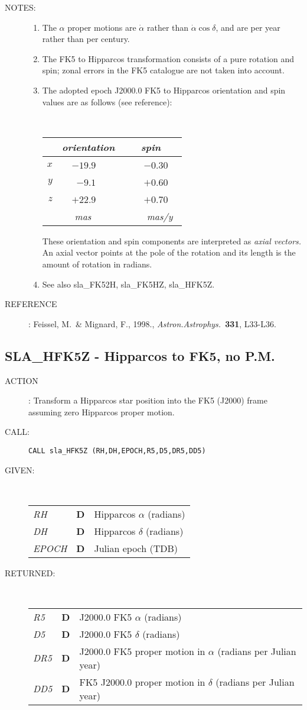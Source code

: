 \documentclass[11pt,twoside]{article}
\newcommand{\xlabel}[1]{}
\newcommand{\routine}[3]
{\hbadness=10000
  \vbox
  {
    \rule{\textwidth}{0.3mm}\\
    {\Large {\bf #1} \hfill #2 \hfill {\bf #1}}\\
    \setlength{\oldspacing}{\topsep}
    \setlength{\topsep}{0.3ex}
    \begin{description}
      #3
    \end{description}
    \setlength{\topsep}{\oldspacing}
  }
}
\renewcommand{\routine}[3]
   {
      \subsection{#1\xlabel{#1} - #2\label{#1}}
       \begin{description}
         #3
       \end{description}
   }
\newcommand{\action}[1]
{\item[ACTION]: #1}
\newcommand{\action}[1]
   {\item[ACTION:] #1}
\newcommand{\call}[1]
{\item[CALL]: \hspace{0.4em}{\tt #1}}
\newlength{\oldspacing}
\renewcommand{\call}[1]
   {
    \item[CALL:] {\tt #1}
   }
\newcommand{\args}[2]
{
  \goodbreak
  \setlength{\oldspacing}{\topsep}
  \setlength{\topsep}{0.3ex}
  \begin{description}
  \item[#1]:\\[1.5ex]
    \begin{tabular}{p{7em}p{6em}p{22em}}
      #2
    \end{tabular}
  \end{description}
  \setlength{\topsep}{\oldspacing}
}
\renewcommand{\args}[2]
   {
     \begin{description}
        \item[#1:]\\
        \begin{tabular}{p{7em}p{6em}l}
           #2
        \end{tabular}
     \end{description}
   }
\newcommand{\spec}[3]
{
  {\em {#1}} & {\bf \mbox{#2}} & {#3}
}
\newcommand{\notes}[1]
{
  \goodbreak
  \setlength{\oldspacing}{\topsep}
  \setlength{\topsep}{0.3ex}
  \begin{description}
    \item[NOTES]:
        #1
  \end{description}
  \setlength{\topsep}{\oldspacing}
}
\renewcommand{\notes}[1]
   {
      \begin{description}
         \item[NOTES:]
            #1
      \end{description}
   }
\newcommand{\aref}[1]
{
  \goodbreak
  \setlength{\oldspacing}{\topsep}
  \setlength{\topsep}{0.3ex}
  \begin{description}
    \item[REFERENCE]:
        #1
  \end{description}
  \setlength{\topsep}{\oldspacing}
}
\newcommand{\aref}[1]
   {
     \begin{description}
       \item[REFERENCE:]
           #1
     \end{description}
   }
\begin{document}
\notes
{
 \begin{enumerate}
  \item The $\alpha$ proper motions are $\dot{\alpha}$ rather than
        $\dot{\alpha}\cos\delta$, and are per year rather than per century.
  \item The FK5 to Hipparcos
        transformation consists of a pure rotation and spin;
        zonal errors in the FK5 catalogue are not taken into account.
  \item The adopted epoch J2000.0 FK5 to Hipparcos orientation and spin
        values are as follows (see reference):

        \vspace{2ex}

        ~~~~~~~~~~~~
        \begin{tabular}{|r|r|r|} \hline
        &
        \multicolumn{1}{|c}{\it orientation} &
        \multicolumn{1}{|c|}{\it ~~~spin~~~} \\ \hline
        $x$ & $-19.9$~~~~ & ~$-0.30$~~ \\
        $y$ &  $-9.1$~~~~ & ~$+0.60$~~ \\
        $z$ & $+22.9$~~~~ & ~$+0.70$~~ \\ \hline
        & {\it mas}~~~~~ & ~{\it mas/y}~ \\ \hline
        \end{tabular}

        \vspace{3ex}

        These orientation and spin components are interpreted as
        {\it axial vectors.}  An axial vector points at the pole of
        the rotation and its length is the amount of rotation in radians.
  \item See also sla\_FK52H, sla\_FK5HZ, sla\_HFK5Z.
 \end{enumerate}
}
\aref {Feissel, M.\ \& Mignard, F., 1998.,  {\it Astron.Astrophys.}\
       {\bf 331}, L33-L36.}
\routine{SLA\_HFK5Z}{Hipparcos to FK5, no P.M.}
{
 \action{Transform a Hipparcos star position
         into the FK5 (J2000) frame assuming zero Hipparcos proper motion.}
 \call{CALL sla\_HFK5Z (RH,DH,EPOCH,R5,D5,DR5,DD5)}
}
\args{GIVEN}
{
 \spec{RH}{D}{Hipparcos $\alpha$ (radians)} \\
 \spec{DH}{D}{Hipparcos $\delta$ (radians)} \\
 \spec{EPOCH}{D}{Julian epoch (TDB)}
}
\args{RETURNED}
{
 \spec{R5}{D}{J2000.0 FK5 $\alpha$ (radians)} \\
 \spec{D5}{D}{J2000.0 FK5 $\delta$ (radians)} \\
 \spec{DR5}{D}{J2000.0 FK5 proper motion in $\alpha$
                              (radians per Julian year)} \\
 \spec{DD5}{D}{FK5 J2000.0 proper motion in $\delta$
                              (radians per Julian year)}
}
\end{document}
